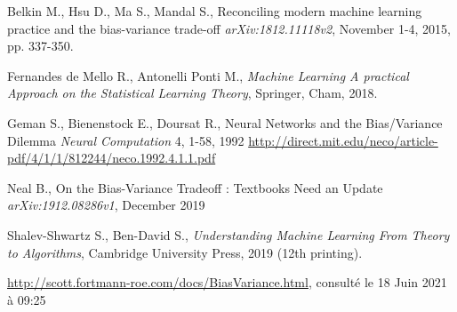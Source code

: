 \documentclass[a4paper]{article}
\begin{document}
\begin{thebibliography}{9}
	
	Belkin M., Hsu D., Ma S., Mandal S.,
	Reconciling modern machine learning practice and the bias-variance trade-off
	\textit{arXiv:1812.11118v2}, November 1-4, 2015, pp. 337-350.
	
	Fernandes de Mello R., Antonelli Ponti M.,
	\textit{Machine Learning A practical Approach on the Statistical Learning Theory},
	Springer, Cham, 2018.
	
	Geman S., Bienenstock E., Doursat R.,
	Neural Networks and the Bias/Variance Dilemma
	\textit{Neural Computation} 4, 1-58, 1992
	\url{http://direct.mit.edu/neco/article-pdf/4/1/1/812244/neco.1992.4.1.1.pdf}
	
	Neal B.,
	On the Bias-Variance Tradeoff : Textbooks Need an Update
	\textit{arXiv:1912.08286v1}, December 2019
	
	Shalev-Shwartz S., Ben-David S.,
	\textit{Understanding Machine Learning From Theory to Algorithms},
	Cambridge University Press, 2019 (12th printing).
	
	\url{http://scott.fortmann-roe.com/docs/BiasVariance.html},
	consulté le 18 Juin 2021 à 09:25
	
	
\end{thebibliography}
\newpage

\listoffigures
\newpage
\end{document}
